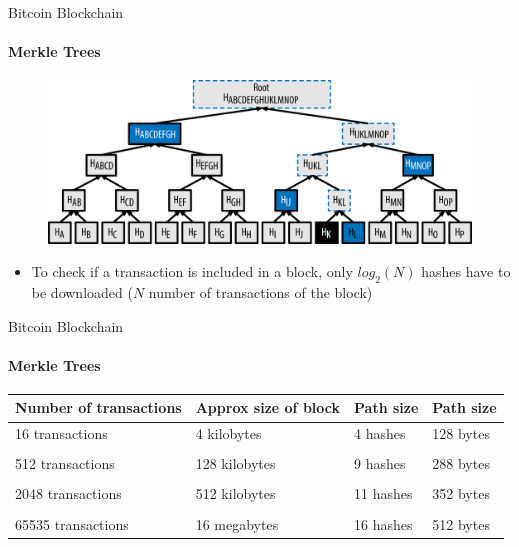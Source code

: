 \documentclass{beamer}
\begin{document}
  \begin{frame}{Bitcoin Blockchain}
    \framesubtitle{Merkle Trees}
    \begin{figure}
      \includegraphics[width=0.6\linewidth]{../img/merkle-tree-path.png}
    \end{figure}
    \begin{itemize}
        \item To check if a transaction is included in a block, only $log_2(N)$ hashes have to be downloaded ($N$ number of transactions of the block)
    \end{itemize}
  \end{frame}
  
  
  
  
  
  \begin{frame}{Bitcoin Blockchain}
  \framesubtitle{Merkle Trees}
      \footnotesize
       \begin{tabularx}{\textwidth}{l l l l}
         \toprule
         \textbf{Number of transactions}	& \textbf{Approx size of block} & \textbf{Path size} &	\textbf{Path size}   \\ \midrule
         16 transactions & 4 kilobytes & 4 hashes & 128 bytes \\
         \\
         512 transactions & 128 kilobytes & 9 hashes & 288 bytes \\
         \\
         2048 transactions & 512 kilobytes & 11 hashes & 352 bytes \\
         \\
         65535 transactions & 16 megabytes & 16 hashes & 512 bytes \\
         \bottomrule
     \end{tabularx}
  \end{frame}
  
  
  
  
\end{document}
